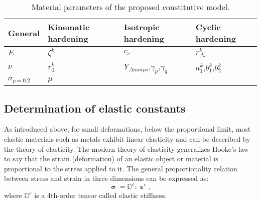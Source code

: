 \begin{table}[htbp]
  \centering
  \caption{Material parameters of the proposed constitutive model.}
    \begin{tabular}{llll}
    \toprule
    General & Kinematic hardening & Isotropic hardening & Cyclic hardening \\
    \midrule
    $E$   & $\zeta^k$ & $c_c$ & $r_{\Delta s}^k$ \\
    $\nu$ & $r_0^k$ & $Y_{\Delta nonps}$,$\gamma_p$,$\gamma_q$ & $a_1^k$,$b_1^k$,$b_2^k$ \\
    $\sigma_{p=0.2}$ & $\mu$ &  & \\
    \bottomrule
    \end{tabular}%
  \label{tab:ParametersCollection}%
\end{table}%


\subsection{Determination of elastic constants}
As introduced above, for small deformations, below the proportional limit, most elastic materials such as metals exhibit linear elasticity and can be described by the theory of elasticity.
The modern theory of elasticity generalizes Hooke's law to say that the strain (deformation) of an elastic object or material is proportional to the stress applied to it.
The general proportionality relation between stress and strain in three dimensions can be expressed as:
\begin{equation}
{\bm{\upsigma }} = {\mathbb{D}^e}:{{\bm{\upepsilon }}^e},
\label{Equ:HookesLaw}
\end{equation}
where ${\mathbb{D}^e}$ is a 4th-order tensor called elastic stiffness.

